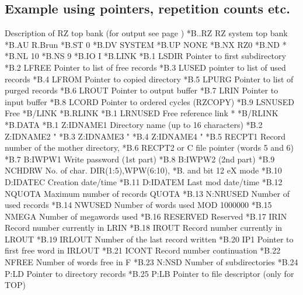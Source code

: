 \subsection{Example using pointers, repetition counts etc.}
\begin{XMPt}{Description of RZ top bank (for output see page \pageref{xmp:rztop})}
*B..RZ  RZ system top bank
*B.AU   R.Brun
*B.ST   0
*B.DV   SYSTEM
*B.UP   NONE
*B.NX   RZ0
*B.ND   *
*B.NL   10
*B.NS   9
*B.IO   I
*B.LINK
*B.1    LSDIR      Pointer to first subdirectory
*B.2    LFREE      Pointer to list of free records
*B.3    LUSED      pointer to list of used records
*B.4    LFROM      Pointer to copied directory
*B.5    LPURG      Pointer to list of purged records
*B.6    LROUT      Pointer to output buffer
*B.7    LRIN       Pointer to input buffer
*B.8    LCORD      Pointer to ordered cycles (RZCOPY)
*B.9    LSNUSED    Free 
*B/LINK
*B.RLINK
*B.1    LRNUSED    Free reference link                     *
*B/RLINK
*B.DATA
*B.1     Z:IDNAME1     Directory name  (up to 16 characters)    
*B.2     Z:IDNAME2                 "                              
*B.3     Z:IDNAME3                 "                              
*B.4     Z:IDNAME4                 "                              
*B.5     RECPT1        Record number of the mother directory,   
*B.6     RECPT2        or C file pointer (words 5 and 6)        
*B.7     B:IWPW1       Write password (1st part)                
*B.8     B:IWPW2                      (2nd part)                
*B.9     NCHDRW        No. of char. DIR(1:5),WPW(6:10), 
*B.                    and  bit 12 eX mode   
*B.10    D:IDATEC      Creation date/time                       
*B.11    D:IDATEM      Last mod date/time                       
*B.12    NQUOTA        Maximum number of records QUOTA          
*B.13    N:NRUSED      Number of used records                   
*B.14    NWUSED        Number of words used MOD 1000000         
*B.15    NMEGA         Number of megawords used                 
*B.16    RESERVED      Reserved                        
*B.17    IRIN          Record number currently in LRIN          
*B.18    IROUT         Record number currently in LROUT         
*B.19    IRLOUT        Number of the last record written        
*B.20    IP1           Pointer to first free word in IRLOUT     
*B.21    ICONT         Record number continuation               
*B.22    NFREE         Number of words free in F                
*B.23    N:NSD         Number of subdirectories                 
*B.24    P:LD          Pointer to directory records             
*B.25    P:LB          Pointer to file descriptor (only for TOP)

\end{XMPt}
